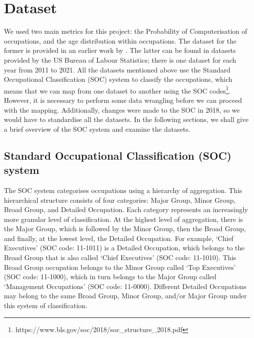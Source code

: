 \documentclass[11pt]{article}
\begin{document}
\newpage

\section{Dataset}
\label{sec:Dataset}
We used two main metrics for this project: the Probability of Computerisation of occupations, and the age distribution within occupations. The dataset for the former is provided in an earlier work by \cite{osborne2017future}. The latter can be found in datasets provided by the US Bureau of Labour Statistics; there is one dataset for each year from 2011 to 2021. All the datasets mentioned above use the Standard Occupational Classification (SOC) system to classify the occupations, which means that we can map from one dataset to another using the SOC codes\footnote{https://www.bls.gov/soc/2018/soc\_structure\_2018.pdf}. However, it is necessary to perform some data wrangling before we can proceed with the mapping. Additionally, changes were made to the SOC in 2018, so we would have to standardise all the datasets. In the following sections, we shall give a brief overview of the SOC system and examine the datasets.

\subsection*{Standard Occupational Classification (SOC) system}
The SOC system categorises occupations using a hierarchy of aggregation. This hierarchical structure consists of four categories: Major Group, Minor Group, Broad Group, and Detailed Occupation. Each category represents an increasingly more granular level of classification. At the highest level of aggregation, there is the Major Group, which is followed by the Minor Group, then the Broad Group, and finally, at the lowest level, the Detailed Occupation. For example, `Chief Executives' (SOC code: 11-1011) is a Detailed Occupation, which belongs to the Broad Group that is also called `Chief Executives' (SOC code: 11-1010). This Broad Group occupation belongs to the Minor Group called `Top Executives' (SOC code: 11-1000), which in turn belongs to the Major Group called `Management Occupations' (SOC code: 11-0000). Different Detailed Occupations may belong to the same Broad Group, Minor Group, and/or Major Group under this system of classification.
\end{document}
